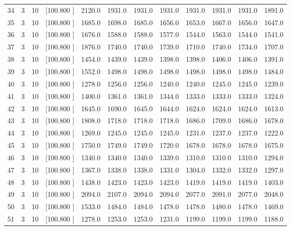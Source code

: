 \documentclass[12pt,a4paper]{article}
\begin{document}
\begin{center}
{\begin{tabular}{r r r r r r r r r r r r}
  34&  3& 10&[100.800   ]&  2120.0&  1931.0&  1931.0&  1931.0&  1931.0&  1931.0&  1931.0&  1891.0\\[-0.02in]
  35&  3& 10&[100.800   ]&  1685.0&  1698.0&  1685.0&  1656.0&  1653.0&  1667.0&  1656.0&  1647.0\\[-0.02in]
  36&  3& 10&[100.800   ]&  1676.0&  1588.0&  1588.0&  1577.0&  1544.0&  1563.0&  1544.0&  1541.0\\[-0.02in]
  37&  3& 10&[100.800   ]&  1876.0&  1740.0&  1740.0&  1739.0&  1710.0&  1740.0&  1734.0&  1707.0\\[-0.02in]
  38&  3& 10&[100.800   ]&  1454.0&  1439.0&  1439.0&  1398.0&  1398.0&  1406.0&  1406.0&  1391.0\\[-0.02in]
  39&  3& 10&[100.800   ]&  1552.0&  1498.0&  1498.0&  1498.0&  1498.0&  1498.0&  1498.0&  1484.0\\[-0.02in]
  40&  3& 10&[100.800   ]&  1278.0&  1256.0&  1256.0&  1240.0&  1240.0&  1245.0&  1245.0&  1239.0\\[-0.02in]
  41&  3& 10&[100.800   ]&  1400.0&  1361.0&  1361.0&  1344.0&  1333.0&  1333.0&  1333.0&  1324.0\\[-0.02in]
  42&  3& 10&[100.800   ]&  1645.0&  1690.0&  1645.0&  1644.0&  1624.0&  1624.0&  1624.0&  1613.0\\[-0.02in]
  43&  3& 10&[100.800   ]&  1808.0&  1718.0&  1718.0&  1718.0&  1686.0&  1709.0&  1686.0&  1678.0\\[-0.02in]
  44&  3& 10&[100.800   ]&  1269.0&  1245.0&  1245.0&  1245.0&  1231.0&  1237.0&  1237.0&  1222.0\\[-0.02in]
  45&  3& 10&[100.800   ]&  1750.0&  1749.0&  1749.0&  1720.0&  1678.0&  1678.0&  1678.0&  1675.0\\[-0.02in]
  46&  3& 10&[100.800   ]&  1340.0&  1340.0&  1340.0&  1339.0&  1310.0&  1310.0&  1310.0&  1294.0\\[-0.02in]
  47&  3& 10&[100.800   ]&  1367.0&  1338.0&  1338.0&  1331.0&  1304.0&  1332.0&  1332.0&  1297.0\\[-0.02in]
  48&  3& 10&[100.800   ]&  1438.0&  1423.0&  1423.0&  1423.0&  1419.0&  1419.0&  1419.0&  1403.0\\[-0.02in]
  49&  3& 10&[100.800   ]&  2094.0&  2107.0&  2094.0&  2094.0&  2077.0&  2091.0&  2077.0&  2048.0\\[-0.02in]
  50&  3& 10&[100.800   ]&  1533.0&  1484.0&  1484.0&  1478.0&  1478.0&  1480.0&  1478.0&  1469.0\\[-0.02in]
  51&  3& 10&[100.800   ]&  1278.0&  1253.0&  1253.0&  1231.0&  1199.0&  1199.0&  1199.0&  1188.0\\[-0.02in]

\end{tabular}}
\end{center}
\end{document}
